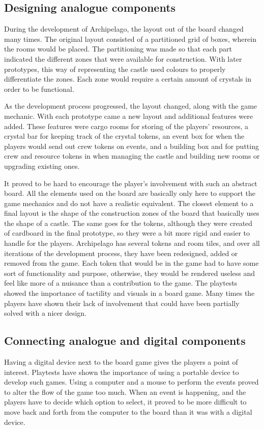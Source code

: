 \subsection{Designing analogue components}
During the development of Archipelago, the layout out of the board changed many times. The original layout consisted of a partitioned grid of boxes, wherein the rooms would be placed. The partitioning was made so that each part indicated the different zones that were available for construction. With later prototypes, this way of representing the castle used colours to properly differentiate the zones. Each zone would require a certain amount of crystals in order to be functional. 

As the development process progressed, the layout changed, along with the game mechanic. With each prototype came a new layout and additional features were added. These features were cargo rooms for storing of the players' resources, a crystal bar for keeping track of the crystal tokens, an event box for when the players would send out crew tokens on events, and a building box and for putting crew and resource tokens in when managing the castle and building new rooms or upgrading existing ones. 

It proved to be hard to encourage the player's involvement with such an abstract board. All the elements used on the board are basically only here to support the game mechanics and do not have a realistic equivalent. The closest element to a final layout is the shape of the construction zones of the board that basically uses the shape of a castle. The same goes for the tokens, although they were created of cardboard in the final prototype, so they were a bit more rigid and easier to handle for the players. Archipelago has several tokens and room tiles, and over all iterations of the development process, they have been redesigned, added or removed from the game. Each token that would be in the game had to have some sort of functionality and purpose, otherwise, they would be rendered useless and feel like more of a nuisance than a contribution to the game. The playtests showed the importance of tactility and visuals in a board game. Many times the players have shown their lack of involvement that could have been partially solved with a nicer design.

\subsection{Connecting analogue and digital components}
Having a digital device next to the board game gives the players a point of interest. Playtests have shown the importance of using a portable device to develop such games. Using a computer and a mouse to perform the events proved to alter the flow of the game too much. When an event is happening, and the players have to decide which option to select, it proved to be more difficult to move back and forth from the computer to the board than it was with a digital device.

